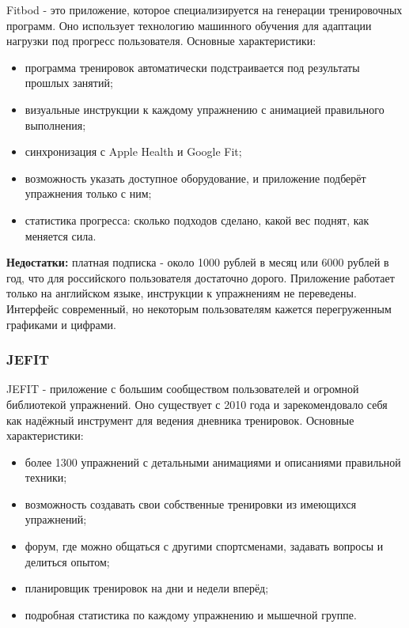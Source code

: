 \documentclass[14pt, a4paper]{extarticle}
\begin{document}
\begin{enumerate}
\noindent Fitbod - это приложение, которое специализируется на генерации тренировочных программ. Оно использует технологию машинного обучения для адаптации нагрузки под прогресс пользователя. Основные характеристики:

\begin{itemize}
\item программа тренировок автоматически подстраивается под результаты прошлых занятий;
\item визуальные инструкции к каждому упражнению с анимацией правильного выполнения;
\item синхронизация с Apple Health и Google Fit;
\item возможность указать доступное оборудование, и приложение подберёт упражнения только с ним;
\item статистика прогресса: сколько подходов сделано, какой вес поднят, как меняется сила.
\end{itemize}

\noindent \textbf{Недостатки:} платная подписка - около 1000 рублей в месяц или 6000 рублей в год, что для российского пользователя достаточно дорого. Приложение работает только на английском языке, инструкции к упражнениям не переведены. Интерфейс современный, но некоторым пользователям кажется перегруженным графиками и цифрами.

\subsubsection{JEFIT}

\noindent JEFIT - приложение с большим сообществом пользователей и огромной библиотекой упражнений. Оно существует с 2010 года и зарекомендовало себя как надёжный инструмент для ведения дневника тренировок. Основные характеристики:

\begin{itemize}
\item более 1300 упражнений с детальными анимациями и описаниями правильной техники;
\item возможность создавать свои собственные тренировки из имеющихся упражнений;
\item форум, где можно общаться с другими спортсменами, задавать вопросы и делиться опытом;
\item планировщик тренировок на дни и недели вперёд;
\item подробная статистика по каждому упражнению и мышечной группе.
\end{itemize}


\end{enumerate}
\end{document}

